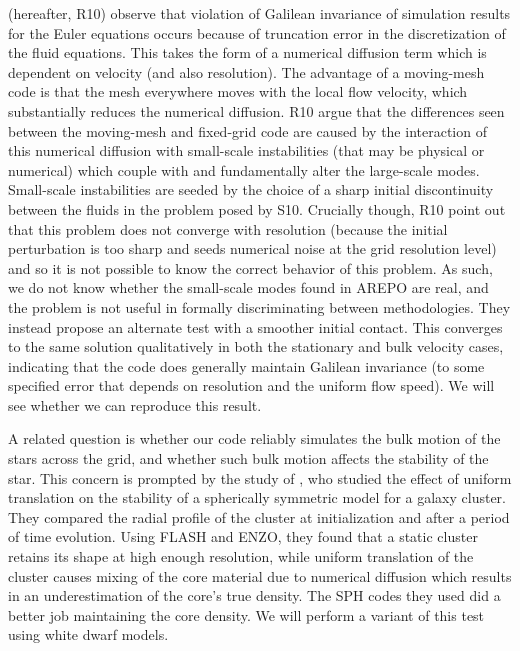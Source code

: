 \documentclass[iop,numberedappendix]{../emulateapj}
\begin{document}
\citet{robertson:2010} (hereafter, R10) observe that violation of Galilean
invariance of simulation results for the Euler equations occurs 
because of truncation error in the discretization of the fluid
equations. This takes the form of a numerical diffusion term which is
dependent on velocity (and also resolution). The advantage of a
moving-mesh code is that the mesh everywhere moves with the local flow
velocity, which substantially reduces the numerical
diffusion. R10 argue that the differences seen
between the moving-mesh and fixed-grid code are caused by the
interaction of this numerical diffusion with small-scale instabilities
(that may be physical or numerical) which couple with and
fundamentally alter the large-scale modes. Small-scale instabilities
are seeded by the choice of a sharp initial discontinuity between the 
fluids in the problem posed by S10. Crucially though,
R10 point out that this problem does not
converge with resolution (because the initial perturbation is too sharp 
and seeds numerical noise at the grid resolution level) 
and so it is not possible to know the correct
behavior of this problem. As such, we do not know whether the
small-scale modes found in AREPO are real, and the problem is not
useful in formally discriminating between methodologies. They instead
propose an alternate test with a smoother initial contact. This
converges to the same solution qualitatively in both the stationary
and bulk velocity cases, indicating that the code does generally
maintain Galilean invariance (to some specified error that depends on
resolution and the uniform flow speed).  We will see whether we can
reproduce this result.

A related question is whether our code reliably simulates the bulk
motion of the stars across the grid, and whether such bulk motion
affects the stability of the star. This concern is prompted by the
study of \cite{tasker:2008}, who studied the effect of uniform
translation on the stability of a spherically symmetric model for a
galaxy cluster. They compared the radial profile of the cluster at
initialization and after a period of time evolution. Using FLASH and
ENZO, they found that a static cluster retains its shape at high
enough resolution, while uniform translation of the cluster causes
mixing of the core material due to numerical diffusion which results
in an underestimation of the core's true density. The SPH codes they
used did a better job maintaining the core density. We will perform a
variant of this test using white dwarf models.
\end{document}
